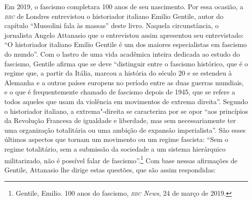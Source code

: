 Em 2019, o fascismo completara 100 anos de seu nascimento. Por essa
ocasião, a \emph{\textsc{bbc}} de Londres entrevistou o historiador italiano
Emilio Gentile, autor do capítulo ``Mussolini fala às
massas'' deste livro. Naquela circunstância, o jornalista Angelo
Attanasio que o entrevistou assim apresentou seu entrevistado: ``O
historiador italiano Emilio Gentile é um dos maiores especialistas em
fascismo do mundo''. Com o lastro de uma vida acadêmica inteira dedicada
ao estudo do fascismo, Gentile afirma que se deve ``distinguir entre o
fascismo histórico, que é o regime que, a partir da Itália, marcou a
história do século 20 e se estendeu à Alemanha e a outros países
europeus no período entre as duas guerras mundiais, e o que é
frequentemente chamado de fascismo depois de 1945, que se refere a todos
aqueles que usam da violência em movimentos de extrema direita''.
Segundo o historiador italiano, a extrema"-direita se caracteriza por se
opor ``aos princípios da Revolução Francesa de igualdade e liberdade,
mas sem necessariamente ter uma organização totalitária ou uma ambição
de expansão imperialista''. São esses últimos aspectos que tornam um
movimento ou um regime fascista: ``Sem o regime totalitário, sem a
submissão da sociedade a um sistema hierárquico militarizado, não é
possível falar de fascismo''.\footnote{Gentile, Emilio. 100 anos do
  fascismo, \textit{\textsc{bbc} News}, 24 de março de 2019.}
Com base nessas afirmações de Gentile, Attanasio lhe dirige estas
questões, que são assim respondidas:


